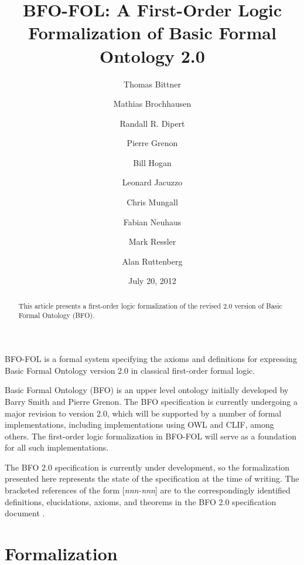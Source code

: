 \documentclass{article}
\begin{document}
\title{BFO-FOL: A First-Order Logic Formalization of Basic Formal Ontology 2.0}

 \author[A]{Thomas Bittner}
 \author[B]{Mathias Brochhausen}
 \author[A]{Randall R. Dipert}
 \author[C]{Pierre Grenon}
 \author[B]{Bill Hogan}
 \author[D]{Leonard Jacuzzo}
 \author[E]{Chris Mungall}
 \author[F,G]{Fabian Neuhaus}
 \author[A]{Mark Ressler}
 \author[A]{Alan Ruttenberg}
 
 \date{July 20, 2012}

\maketitle

\begin{abstract}
This article presents a first-order logic formalization of the revised 2.0 version of Basic Formal Ontology (BFO).
\end{abstract}



BFO-FOL is a formal system specifying the axioms and definitions for expressing Basic Formal Ontology version 2.0 in classical first-order formal logic.

Basic Formal Ontology (BFO) is an upper level ontology initially developed by Barry Smith and Pierre Grenon.  The BFO specification is currently undergoing a major revision to version 2.0, which will be supported by a number of formal implementations, including implementations using OWL and CLIF, among others.  The first-order logic formalization in BFO-FOL will serve as a foundation for all such implementations.

The BFO 2.0 specification is currently under development, so the formalization presented here represents the state of the specification at the time of writing.  The bracketed references of the form [\emph{nnn-nnn}] are to the correspondingly identified definitions, elucidations, axioms, and theorems in the BFO 2.0 specification document \cite{BFO2}.


\section{Formalization}
\end{document}
